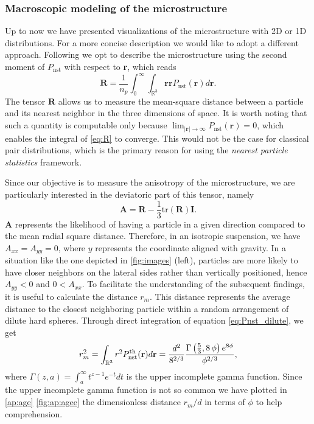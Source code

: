 \subsubsection*{Macroscopic modeling of the microstructure}
Up to now we have presented visualizations of the microstructure with 2D or 1D distributions. 
For a more concise description we would like to adopt a different approach. 
Following \citet{zhang2023evolution} we opt to describe the microstructure using the second moment of $P_\text{nst}$ with respect to \textbf{r}, which reads
\begin{equation}
    \textbf{R} =\frac{1}{n_p} 
    \int_0^\infty 
    \int_{\mathbb{R}^3} \textbf{rr} P_\text{nst}(\textbf{r}) d\textbf{r}.
    \label{eq:R}
\end{equation}
The tensor $\textbf{R}$ allows us to measure the mean-square distance between a particle and its nearest neighbor in the three dimensions of space.
It is worth noting that such a quantity is computable only because $\lim_{|\textbf{r}|\to \infty} P_\text{nst}(\textbf{r}) = 0$, which enables the integral of \ref{eq:R} to converge. 
This would not be the case for classical pair distributions, which is the primary reason for using the \textit{nearest particle statistics} framework. 

Since our objective is to measure the anisotropy of the microstructure, we are particularly interested in the deviatoric part of this tensor, namely
\begin{equation*}
    \textbf{A} = \textbf{R} - \frac{1}{3}  \text{tr}(\textbf{R}) \textbf{I}.
\end{equation*}
$\textbf{A}$ represents the likelihood of having a particle in a given direction compared to the mean radial square distance. 
Therefore, in an isotropic suspension, we have $A_{xx} = A_{yy} = 0$, where $y$ represents the coordinate aligned with gravity. 
In a situation like the one depicted in \ref{fig:images} (left), particles are more likely to have closer neighbors on the lateral sides rather than vertically positioned, hence  $A_{yy} < 0$ and $0 < A_{xx}$. 
To facilitate the understanding of the subsequent findings, it is useful to calculate the distance $r_m$. 
This distance represents the average distance to the closest neighboring particle within a random arrangement of dilute hard spheres. 
Through direct integration of equation \ref{eq:Pnst_dilute}, we get
\begin{align}
    r_m^2
    = 
    \int_{\mathbb{R}^3} r^2 P_\text{nst}^\text{th}(\textbf{r}) d\textbf{r} 
    =  \frac{d^2}{8^{2/3}}\frac{\Gamma\left({{5}\over{3}} , 8\,\phi\right)e^{8\phi}}{\phi^{2/3}},
\end{align}
where $\Gamma(z,a) = \int_a^\infty t^{z-1} e^{-t} dt$ is the upper incomplete gamma function.
Since the upper incomplete gamma function is not so common we have plotted in \ref{ap:age} \ref{fig:ap:agee} the dimensionless distance $r_m/d$ in terms of $\phi$ to help comprehension. 


